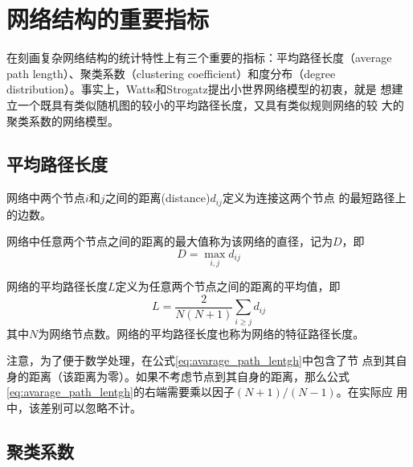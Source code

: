 \documentclass[oneside, phd]{njuthesis}
\begin{document}
\section{网络结构的重要指标}

在刻画复杂网络结构的统计特性上有三个重要的指标：平均路径长度（average
  path length）、聚类系数（clustering coefficient）和度分布（degree
  distribution）。事实上，Watts和Strogatz提出小世界网络模型的初衷，就是
想建立一个既具有类似随机图的较小的平均路径长度，又具有类似规则网络的较
大的聚类系数的网络模型。

\subsection{平均路径长度}

\begin{definition}[节点之间的距离]
网络中两个节点$i$和$j$之间的距离(distance)$d_{ij}$定义为连接这两个节点
的最短路径上的边数。
\end{definition}

\begin{definition}[直径]
网络中任意两个节点之间的距离的最大值称为该网络的直径，记为$D$，即
\begin{equation}\label{eq:dimension}
    D = \max_{i,j} d_{ij}
\end{equation}
\end{definition}

\begin{definition}[平均路径长度]
网络的平均路径长度$L$定义为任意两个节点之间的距离的平均值，即
\begin{equation}\label{eq:avarage_path_lentgh}
    L = \frac{2}{N(N+1)}\sum_{i\geq j}d_{ij}
\end{equation}
其中$N$为网络节点数。网络的平均路径长度也称为网络的特征路径长度。
\end{definition}

注意，为了便于数学处理，在公式\eqref{eq:avarage_path_lentgh}中包含了节
点到其自身的距离（该距离为零）。如果不考虑节点到其自身的距离，那么公式
\eqref{eq:avarage_path_lentgh}的右端需要乘以因子$(N+1)/(N-1)$。在实际应
用中，该差别可以忽略不计。

\subsection{聚类系数}
\end{document}
